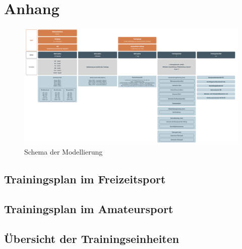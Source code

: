 \appendix
\chapter{Anhang}
\label{anhang}
\begin{figure}[h]
    \includegraphics[height=\textwidth]{gfx/modellierung.png}
    \caption{Schema der Modellierung}
    \label{anhang:modellierung}
\end{figure}
\newpage
\section{Trainingsplan im Freizeitsport}
\label{anhang:freizeitsport}
\newpage
\section{Trainingsplan im Amateursport}
\label{anhang:amateursport}
\newpage
\section{Übersicht der Trainingseinheiten}
\label{anhang:trainingsarten}

